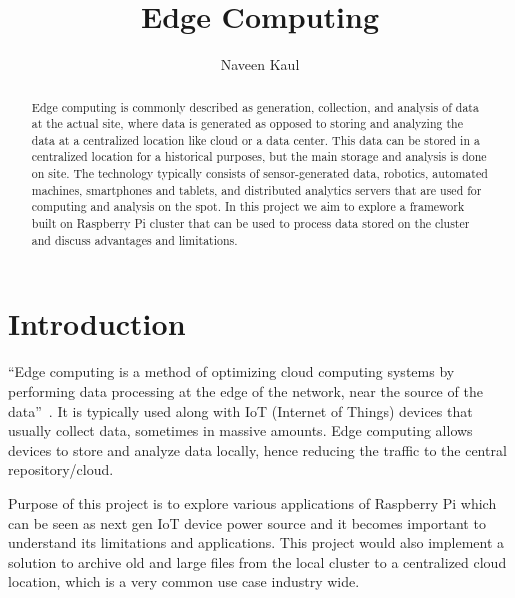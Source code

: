 
\title{Edge Computing}


\author{Naveen Kaul}

\renewcommand{\shortauthors}{N. Kaul}


\begin{abstract}
Edge computing is commonly described as generation, collection, and
analysis of data at the actual site, where data is generated as
opposed to storing and analyzing the data at a centralized location
like cloud or a data center. This data can be stored in a centralized
location for a historical purposes, but the main storage and analysis
is done on site. The technology typically consists of sensor-generated
data, robotics, automated machines, smartphones and tablets, and
distributed analytics servers that are used for computing and analysis
on the spot. In this project we aim to explore a framework built on
Raspberry Pi cluster that can be used to process data stored on the cluster and discuss advantages and limitations. 
\end{abstract}



\maketitle

\section{Introduction}
``Edge computing is a method of optimizing cloud computing systems by performing data processing at the edge of the network, near the source of the data''~\cite{hid-sp18-510-edge-wiki}. It is typically used along with IoT (Internet of Things) devices that usually collect data, sometimes in massive amounts. Edge computing allows devices to store and analyze data locally, hence reducing the traffic to the central repository/cloud.

Purpose of this project is to explore various applications of Raspberry Pi which can be seen as next gen IoT device power source and it becomes important to understand its limitations and applications. This project would also implement a solution to archive old and large files from the local cluster to a centralized cloud location, which is a very common use case industry wide.

